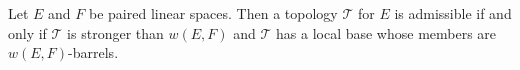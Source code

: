 Let $E$ and $F$ be paired linear spaces. Then a topology $\mathcal{T}$ for $E$ is admissible if and only if $\mathcal{T}$ is stronger than $w(E,F)$ and $\mathcal{T}$ has a local base whose members are $w(E,F)$-barrels.
